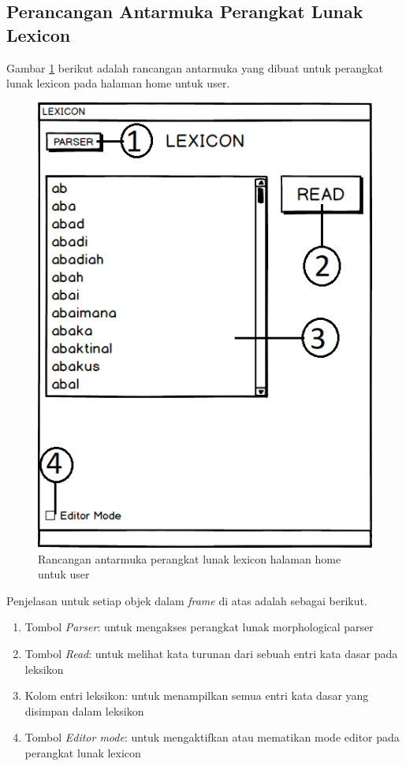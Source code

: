 \subsection{Perancangan Antarmuka Perangkat Lunak Lexicon}
\label{sec:antarmukaLexicon}

Gambar \ref{mockup-lexicon-home-user} berikut adalah rancangan antarmuka yang dibuat untuk perangkat lunak lexicon pada halaman home untuk user.

\begin{figure}[H]
\centering
\includegraphics[scale=0.8]{Gambar/mockup-lexicon-home-user}
\caption{Rancangan antarmuka perangkat lunak lexicon halaman home untuk user} 
\label{mockup-lexicon-home-user}
\end{figure}

Penjelasan untuk setiap objek dalam \textit{frame} di atas adalah sebagai berikut.

\begin{enumerate}
	\item Tombol \textit{Parser}: untuk mengakses perangkat lunak morphological parser
	\item Tombol \textit{Read}: untuk melihat kata turunan dari sebuah entri kata dasar pada leksikon
	\item Kolom entri leksikon: untuk menampilkan semua entri kata dasar yang disimpan dalam leksikon
	\item Tombol \textit{Editor mode}: untuk mengaktifkan atau mematikan mode editor pada perangkat lunak lexicon
\end{enumerate}

